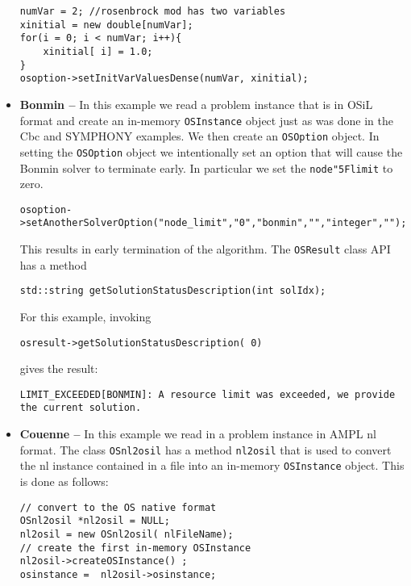 \documentclass[11pt]{article}
\renewcommand{\_}{{\char"5F}}
\renewcommand{\{}{{\char"7B}}
\renewcommand{\}}{{\char"7D}}
\renewcommand{\^}{{\char"0D}}
\renewcommand{\'}{{\char"0D}}
\begin{document}
\begin{itemize}
\begin{verbatim}
numVar = 2; //rosenbrock mod has two variables 
xinitial = new double[numVar];
for(i = 0; i < numVar; i++){
    xinitial[ i] = 1.0;
}
osoption->setInitVarValuesDense(numVar, xinitial);
\end{verbatim}



\item {\bf Bonmin --}  In this example we read a problem instance that is in OSiL format and create 
an in-memory {\tt OSInstance} object just as was done in the Cbc and SYMPHONY examples.   
We then create an {\tt OSOption} object.  In setting the  {\tt OSOption} object we intentionally 
set an option that will cause the Bonmin solver to terminate early.  In particular we set the 
{\tt node\_limit} to zero. 

\begin{verbatim}
osoption->setAnotherSolverOption("node_limit","0","bonmin","","integer","");
\end{verbatim}

This results in early termination of the algorithm. The {\tt OSResult} class API has a method
\begin{verbatim}
std::string getSolutionStatusDescription(int solIdx);
\end{verbatim}

For this example, invoking
\begin{verbatim}
osresult->getSolutionStatusDescription( 0)
\end{verbatim}
gives the result:
\begin{verbatim}
LIMIT_EXCEEDED[BONMIN]: A resource limit was exceeded, we provide the current solution.
\end{verbatim}


\item {\bf Couenne --}   In this example we read in a problem instance in AMPL nl format.  
The class {\tt OSnl2osil}  has a method {\tt nl2osil} that is used to convert the nl instance 
contained in a file into an in-memory {\tt OSInstance} object. This is done as follows:

\begin{verbatim}
// convert to the OS native format
OSnl2osil *nl2osil = NULL;
nl2osil = new OSnl2osil( nlFileName);
// create the first in-memory OSInstance
nl2osil->createOSInstance() ;
osinstance =  nl2osil->osinstance;
\end{verbatim}
\end{itemize}
\end{document}
